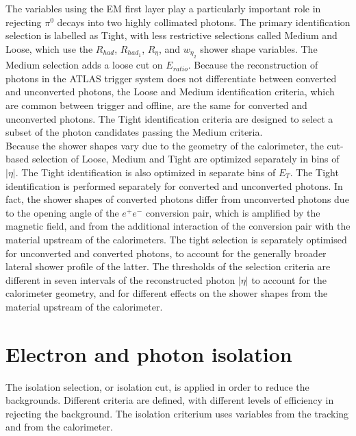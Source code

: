 \documentclass[a4paper, oneside]{book}
\begin{document}
			The variables using the EM first layer play a particularly important role in rejecting $\pi^0$ decays into
			two highly collimated photons. The primary identification selection is labelled as Tight, with less restrictive selections called
			Medium and Loose, which use the $R_{had}$, $R_{had_1}$, $R_{\eta}$, and $w_{\eta_2}$ shower shape variables. The Medium selection adds a loose cut on $E_{ratio}$. Because the reconstruction of photons in the ATLAS trigger system does not differentiate between converted and unconverted photons, the Loose and Medium identification criteria, which are common between trigger and offline, are the same for converted and unconverted photons. The Tight identification criteria are designed to select a subset of the photon candidates passing the Medium criteria.\\
			Because the shower shapes vary due to the geometry of the calorimeter, the cut-based selection of Loose, Medium and Tight
			are optimized separately in bins of $|\eta|$. The Tight identification is also optimized in separate bins of $E_T$. The Tight identification is performed separately for converted and
			unconverted photons. In fact, the shower shapes of converted photons differ from unconverted photons due to the opening angle of the $e^{+}e^{-}$ conversion pair, which is amplified by the magnetic field, and from the additional interaction of the conversion pair with the material upstream of the calorimeters.
			The tight selection is separately optimised for unconverted and converted photons, to account for the generally broader lateral shower profile of the latter. The thresholds of the selection criteria are different in seven intervals of the reconstructed photon $|\eta|$ to account for the calorimeter geometry, and for different effects on the shower shapes from the material upstream of the calorimeter.
	
		\section{Electron and photon isolation}\label{section:Iso}
		The isolation selection, or isolation cut, is applied in order to reduce the backgrounds. Different criteria are defined, with different levels
		of efficiency in rejecting the background. The isolation criterium uses variables from the tracking and from the calorimeter. \cite{El ph isol}
		
\end{document}
